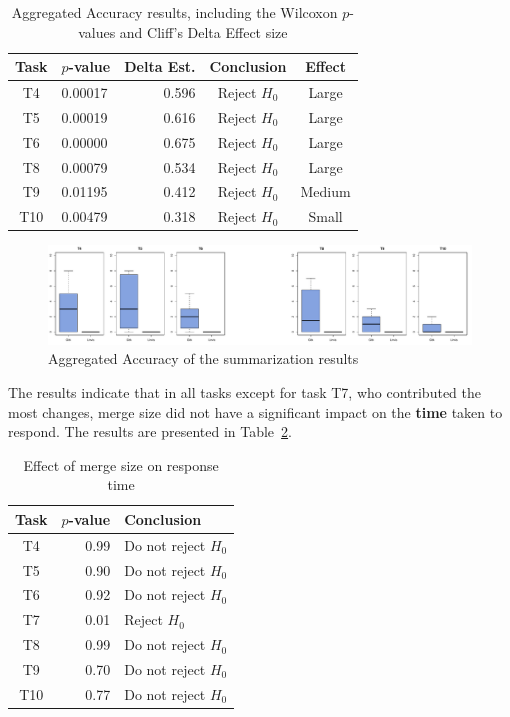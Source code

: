 \begin{table}[htpb]
  \centering
  \caption{Aggregated Accuracy results, including the Wilcoxon
    $p$-values and Cliff's Delta Effect size}
  \label{tab:accuracy_results}
  \begin{tabular}{clrcc}
    \toprule
    Task & $p$-value & Delta Est. & Conclusion   & Effect\\\midrule
    T4   & 0.00017   & 0.596      & Reject $H_0$ & Large\\
    T5   & 0.00019   & 0.616      & Reject $H_0$ & Large\\
    T6   & 0.00000   & 0.675      & Reject $H_0$ & Large\\
    T8   & 0.00079   & 0.534      & Reject $H_0$ & Large\\
    T9   & 0.01195   & 0.412      & Reject $H_0$ & Medium\\
    T10  & 0.00479   & 0.318      & Reject $H_0$ & Small\\
    \bottomrule
  \end{tabular}
\end{table}

\begin{figure}[htpb]
  \centering
  \includegraphics[width=0.9\linewidth]{Figures/evaluation/accuracy.pdf}
  \caption{Aggregated Accuracy of the summarization results}
  \label{fig:agg_accuracy}
\end{figure}

The results indicate that in all tasks except for task T7, who
contributed the most changes, merge size did not have a significant
impact on the \textbf{time} taken to respond. The results are presented
in Table~\ref{tab:cross_commit_timing}.

\begin{table}[htpb]
  \centering
  \caption{Effect of merge size on response time}
  \label{tab:cross_commit_timing}
  \begin{tabular}{crl}
    \toprule
    Task & $p$-value & Conclusion\\\midrule
    T4   & 0.99      & Do not reject $H_0$\\
    T5   & 0.90      & Do not reject $H_0$\\
    T6   & 0.92      & Do not reject $H_0$\\
    T7   & 0.01      & Reject $H_0$\\
    T8   & 0.99      & Do not reject $H_0$\\
    T9   & 0.70      & Do not reject $H_0$\\
    T10  & 0.77      & Do not reject $H_0$\\
    \bottomrule
  \end{tabular}
\end{table}

